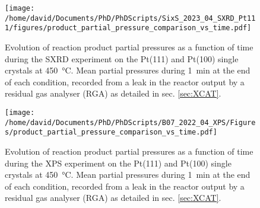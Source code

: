 \begin{figure}[!htb]
    \centering
    \texttt{[image: /home/david/Documents/PhD/PhDScripts/SixS\_2023\_04\_SXRD\_Pt111/figures/product\_partial\_pressure\_comparison\_vs\_time.pdf]}
    \caption{
        Evolution of reaction product partial pressures as a function of time during the SXRD experiment on the Pt(111) and Pt(100) single crystals at \qty{450}{\degreeCelsius}.
        Mean partial pressures during \qty{1}{\minute} at the end of each condition, recorded from a leak in the reactor output by a residual gas analyser (RGA) as detailed in sec. \ref{sec:XCAT}.
    }
    \label{fig:RGA450SXRDPt111AndPt100Time}
\end{figure}

\begin{figure}[!htb]
    \centering
    \texttt{[image: /home/david/Documents/PhD/PhDScripts/B07\_2022\_04\_XPS/Figures/product\_partial\_pressure\_comparison\_vs\_time.pdf]}
    \caption{
        Evolution of reaction product partial pressures as a function of time during the XPS experiment on the Pt(111) and Pt(100) single crystals at \qty{450}{\degreeCelsius}.
        Mean partial pressures during \qty{1}{\minute} at the end of each condition, recorded from a leak in the reactor output by a residual gas analyser (RGA) as detailed in sec. \ref{sec:XCAT}.
    }
    \label{fig:RGA450XPSPt111AndPt100Time}
\end{figure}

